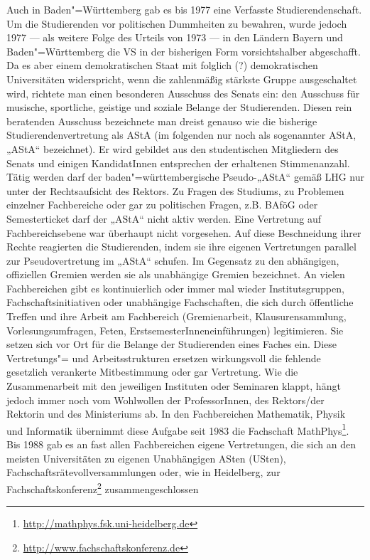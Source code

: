 Auch in Baden"=Württemberg gab es bis 1977 eine Verfasste
Studierendenschaft. Um die Studierenden vor politischen Dummheiten zu
bewahren, wurde jedoch 1977 — als weitere Folge des Urteils von 1973 — in
den Ländern Bayern und Baden"=Württemberg die VS in der bisherigen Form
vorsichtshalber abgeschafft. Da es aber einem demokratischen Staat mit
folglich (?) demokratischen Universitäten widerspricht, wenn die
zahlenmäßig stärkste Gruppe ausgeschaltet wird, richtete man einen
besonderen Ausschuss des Senats ein: den Ausschuss für musische,
sportliche, geistige und soziale Belange der Studierenden. Diesen rein
beratenden Ausschuss bezeichnete man dreist genauso wie die bisherige
Studierendenvertretung als AStA (im folgenden nur noch als sogenannter
AStA, „AStA“ bezeichnet). Er wird gebildet aus den studentischen
Mitgliedern des Senats und einigen KandidatInnen entsprechen der
erhaltenen Stimmenanzahl. Tätig werden darf der baden"=württembergische
Pseudo-„AStA“ gemäß LHG nur unter der Rechtsaufsicht des Rektors. Zu
Fragen des Studiums, zu Problemen einzelner Fachbereiche oder gar zu
politischen Fragen, z.B. BAföG oder Semesterticket darf der „AStA“ nicht
aktiv werden. Eine Vertretung auf Fachbereichsebene war überhaupt nicht
vorgesehen. Auf diese Beschneidung ihrer Rechte reagierten die
Studierenden, indem sie ihre eigenen Vertretungen parallel zur
Pseudovertretung im „AStA“ schufen. Im Gegensatz zu den abhängigen,
offiziellen Gremien werden sie als unabhängige Gremien bezeichnet.
An vielen Fachbereichen gibt es kontinuierlich oder immer mal wieder
Institutsgruppen, Fachschaftsinitiativen oder unabhängige Fachschaften,
die sich durch öffentliche Treffen und ihre Arbeit am Fachbereich
(Gremienarbeit, Klausurensammlung, Vorlesungsumfragen, Feten,
ErstsemesterInneneinführungen) legitimieren. Sie setzen sich vor Ort für
die Belange der Studierenden eines Faches ein. Diese Vertretungs"= und
Arbeitsstrukturen ersetzen wirkungsvoll die fehlende gesetzlich verankerte
Mitbestimmung oder gar Vertretung. Wie die Zusammenarbeit mit den
jeweiligen Instituten oder Seminaren klappt, hängt jedoch immer noch vom
Wohlwollen der ProfessorInnen, des Rektors/der Rektorin und des Ministeriums ab. In den
Fachbereichen Mathematik, Physik und Informatik übernimmt diese Aufgabe
seit 1983 die Fachschaft MathPhys\footnote{\url{http://mathphys.fsk.uni-heidelberg.de}}. Bis 1988 gab es an fast allen
Fachbereichen eigene Vertretungen, die sich an den meisten Universitäten
zu eigenen Unabhängigen ASten (USten), Fachschaftsrätevollversammlungen
oder, wie in Heidelberg, zur Fachschaftskonferenz\footnote{\url{http://www.fachschaftskonferenz.de}} zusammengeschlossen
